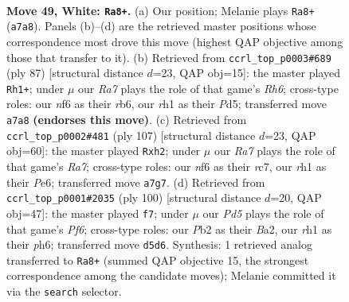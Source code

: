 \documentclass[11pt]{article}
\begin{document}
\clearpage

\begin{figure}[p]\centering
\begin{subfigure}{0.46\textwidth}\centering
\resizebox{\linewidth}{!}{%
\newchessgame
\chessboard[
  setfen={4k3/R7/5n2/1P1P4/p1p3P1/8/1PK5/7r w - - 9 49},
  showmover=false,
  pgfstyle=straightmove, color=movearrow, markmove={a7-a8}
]}
\caption{}
\end{subfigure}\hfill
\begin{subfigure}{0.46\textwidth}\centering
\resizebox{\linewidth}{!}{%
\newchessgame
\chessboard[
  setfen={6k1/6p1/1R6/1p1p3P/8/7r/P7/3K4 b - - 2 44},
  showmover=false,
  pgfstyle=straightmove, color=movearrow, markmove={h3-h1}
]}
\caption{}
\end{subfigure}
\\[4pt]
\begin{subfigure}{0.46\textwidth}\centering
\resizebox{\linewidth}{!}{%
\newchessgame
\chessboard[
  setfen={6k1/2R2p2/4p1p1/4N3/7p/5K2/r6P/8 b - - 1 54},
  showmover=false,
  pgfstyle=straightmove, color=movearrow, markmove={a2-h2}
]}
\caption{}
\end{subfigure}\hfill
\begin{subfigure}{0.46\textwidth}\centering
\resizebox{\linewidth}{!}{%
\newchessgame
\chessboard[
  setfen={5r1k/p6n/5P1p/1p2R3/7P/6K1/BP6/8 w - - 1 51},
  showmover=false,
  pgfstyle=straightmove, color=movearrow, markmove={f6-f7}
]}
\caption{}
\end{subfigure}
\caption{\textbf{Move 49, White: \texttt{Ra8+}.} (a) Our position; Melanie plays \texttt{Ra8+} (\texttt{a7a8}). Panels (b)--(d) are the retrieved master positions whose correspondence most drove this move (highest QAP objective among those that transfer to it). (b) Retrieved from \texttt{ccrl\_top\_p0003\#689} (ply 87) [structural distance $d$=23, QAP obj=15]: the master played \texttt{Rh1+}; under $\mu$ our \emph{Ra7} plays the role of that game's \emph{Rh6}; cross-type roles: our \emph{n}f6 as their \emph{r}b6, our \emph{r}h1 as their \emph{P}d5; transferred move \texttt{a7a8} \textbf{(endorses this move)}. (c) Retrieved from \texttt{ccrl\_top\_p0002\#481} (ply 107) [structural distance $d$=23, QAP obj=60]: the master played \texttt{Rxh2}; under $\mu$ our \emph{Ra7} plays the role of that game's \emph{Ra7}; cross-type roles: our \emph{n}f6 as their \emph{r}c7, our \emph{r}h1 as their \emph{P}e6; transferred move \texttt{a7g7}. (d) Retrieved from \texttt{ccrl\_top\_p0001\#2035} (ply 100) [structural distance $d$=20, QAP obj=47]: the master played \texttt{f7}; under $\mu$ our \emph{Pd5} plays the role of that game's \emph{Pf6}; cross-type roles: our \emph{P}b2 as their \emph{B}a2, our \emph{r}h1 as their \emph{p}h6; transferred move \texttt{d5d6}. Synthesis: 1 retrieved analog transferred to \texttt{Ra8+} (summed QAP objective 15, the strongest correspondence among the candidate moves); Melanie committed it via the \texttt{search} selector.}
\label{fig:thought-m96}
\end{figure}
\end{document}
